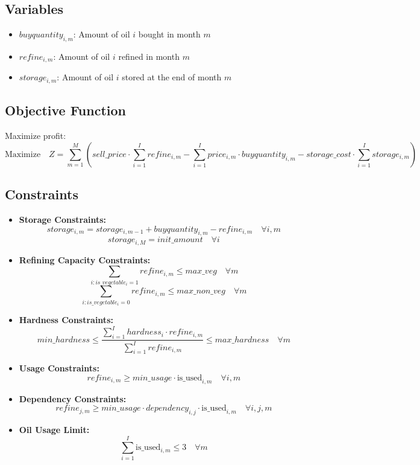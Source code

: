 \documentclass{article}
\begin{document}
\subsection*{Variables}
\begin{itemize}
    \item \( buyquantity_{i, m} \): Amount of oil \( i \) bought in month \( m \)
    \item \( refine_{i, m} \): Amount of oil \( i \) refined in month \( m \)
    \item \( storage_{i, m} \): Amount of oil \( i \) stored at the end of month \( m \)
\end{itemize}

\subsection*{Objective Function}
Maximize profit:
\[
\text{Maximize} \quad Z = \sum_{m=1}^{M} \left( sell\_price \cdot \sum_{i=1}^{I} refine_{i,m} - \sum_{i=1}^{I} price_{i,m} \cdot buyquantity_{i,m} - storage\_cost \cdot \sum_{i=1}^{I} storage_{i,m} \right)
\]

\subsection*{Constraints}
\begin{itemize}
    \item \textbf{Storage Constraints:}
    \[
    storage_{i,m} = storage_{i,m-1} + buyquantity_{i,m} - refine_{i,m} \quad \forall i, m
    \]
    \[
    storage_{i,M} = init\_amount \quad \forall i
    \]

    \item \textbf{Refining Capacity Constraints:}
    \[
    \sum_{i: is\_vegetable_{i}=1} refine_{i,m} \leq max\_veg \quad \forall m
    \]
    \[
    \sum_{i: is\_vegetable_{i}=0} refine_{i,m} \leq max\_non\_veg \quad \forall m
    \]

    \item \textbf{Hardness Constraints:}
    \[
    min\_hardness \leq \frac{\sum_{i=1}^{I} hardness_{i} \cdot refine_{i,m}}{\sum_{i=1}^{I} refine_{i,m}} \leq max\_hardness \quad \forall m
    \]

    \item \textbf{Usage Constraints:}
    \[
    refine_{i,m} \geq min\_usage \cdot \text{is\_used}_{i,m} \quad \forall i, m
    \]

    \item \textbf{Dependency Constraints:}
    \[
    refine_{j,m} \geq min\_usage \cdot dependency_{i,j} \cdot \text{is\_used}_{i,m} \quad \forall i,j, m
    \]

    \item \textbf{Oil Usage Limit:}
    \[
    \sum_{i=1}^{I} \text{is\_used}_{i,m} \leq 3 \quad \forall m
    \]
\end{itemize}
\end{document}
